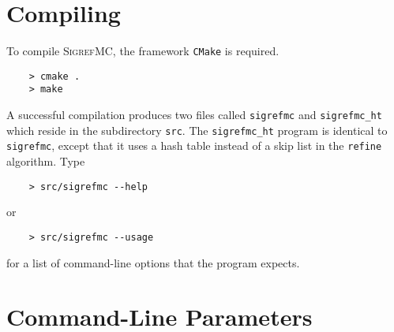 
\section{Compiling}

To compile \textsc{SigrefMC}, the framework \texttt{CMake} is required.

\begin{verbatim}
    > cmake .
    > make
\end{verbatim}   

A successful compilation produces two files called \texttt{sigrefmc} and \texttt{sigrefmc\_ht} which reside in the subdirectory \texttt{src}.
The \texttt{sigrefmc\_ht} program is identical to \texttt{sigrefmc}, except that it uses a hash table instead of a skip list in the \texttt{refine} algorithm.
%
Type
\begin{verbatim}
    > src/sigrefmc --help
\end{verbatim}
or
\begin{verbatim}
    > src/sigrefmc --usage
\end{verbatim}
for a list of command-line options that the program expects.

\section{Command-Line Parameters}

